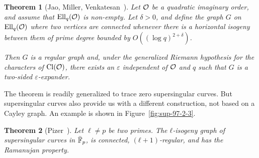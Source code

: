 \documentclass{report}
\theoremstyle{plain}
\newtheorem{theorem}{Theorem}
\theoremstyle{definition}
\begin{document}
\begin{theorem}[{Jao, Miller, Venkatesan~\cite{jao+miller+venkatesan09}}]
  \label{th:ord-exp}
  Let $\mathcal{O}$ be a quadratic imaginary order, and assume that
  $\operatorname{Ell}_q(\mathcal{O})$ is non-empty. %
  Let $δ>0$, and define the graph $G$ on $\operatorname{Ell}_q(\mathcal{O})$ where two
  vertices are connected whenever there is a horizontal isogeny
  between them of prime degree bounded by $O((\log q)^{2+δ})$.

  Then $G$ is a regular graph and, under the generalized Riemann
  hypothesis for the characters of $\operatorname{Cl}(\mathcal{O})$, there exists an $ε$
  independent of $\mathcal{O}$ and $q$ such that $G$ is a two-sided
  $ε$-expander.
\end{theorem}

The theorem is readily generalized to trace zero supersingular
curves. %
But supersingular curves also provide us with a different
construction, not based on a Cayley graph. %
An example is shown in Figure~\ref{fig:sup-97-2-3}. %

\begin{theorem}[{Pizer~\cite{pizer1,pizer2}}]
  \label{th:ss-exp}
  Let $\ell≠p$ be two primes. %
  The $ℓ$-isogeny graph of supersingular curves in $\bar{\mathbb{F}}_p$, is
  connected, $(ℓ+1)$-regular, and has the Ramanujan property.
\end{theorem}
\end{document}
